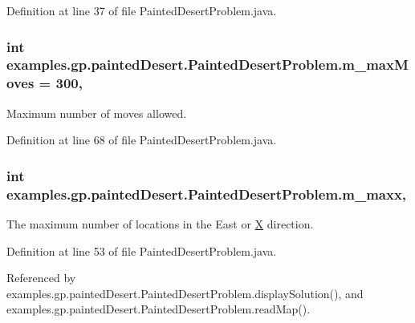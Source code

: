 Definition at line 37 of file Painted\-Desert\-Problem.\-java.

\hypertarget{classexamples_1_1gp_1_1painted_desert_1_1_painted_desert_problem_a9324a92e69b6e83b4ceb0156eae7a68a}{
\subsubsection[{m\-\_\-max\-Moves}]{\setlength{\rightskip}{0pt plus 5cm}int examples.\-gp.\-painted\-Desert.\-Painted\-Desert\-Problem.\-m\-\_\-max\-Moves = 300\hspace{0.3cm}{\ttfamily [static]}, {\ttfamily [private]}}}\label{classexamples_1_1gp_1_1painted_desert_1_1_painted_desert_problem_a9324a92e69b6e83b4ceb0156eae7a68a}
Maximum number of moves allowed. 

Definition at line 68 of file Painted\-Desert\-Problem.\-java.

\hypertarget{classexamples_1_1gp_1_1painted_desert_1_1_painted_desert_problem_a9fe6becef13c8c098487b2d9edc9be5f}{
\subsubsection[{m\-\_\-maxx}]{\setlength{\rightskip}{0pt plus 5cm}int examples.\-gp.\-painted\-Desert.\-Painted\-Desert\-Problem.\-m\-\_\-maxx\hspace{0.3cm}{\ttfamily [static]}, {\ttfamily [private]}}}\label{classexamples_1_1gp_1_1painted_desert_1_1_painted_desert_problem_a9fe6becef13c8c098487b2d9edc9be5f}
The maximum number of locations in the East or \hyperlink{classexamples_1_1gp_1_1painted_desert_1_1_x}{X} direction. 

Definition at line 53 of file Painted\-Desert\-Problem.\-java.



Referenced by examples.\-gp.\-painted\-Desert.\-Painted\-Desert\-Problem.\-display\-Solution(), and examples.\-gp.\-painted\-Desert.\-Painted\-Desert\-Problem.\-read\-Map().

